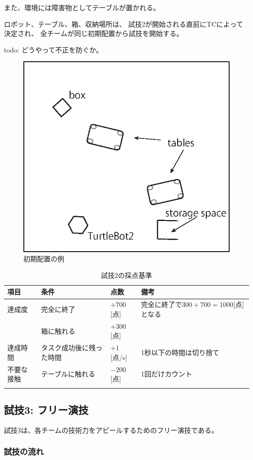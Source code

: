 \documentclass[a4j]{jarticle}
\def\thline{\noalign{\hrule height 1pt}}
\begin{document}
また、環境には障害物としてテーブルが置かれる。

ロボット、テーブル、箱、収納場所は、
試技2が開始される直前にTCによって決定され、
全チームが同じ初期配置から試技を開始する。

todo: どうやって不正を防ぐか。


\begin{figure}[h]
	\begin{center}
		\includegraphics[width=0.4\linewidth]{./IMAGE/test2.eps}
		\caption{初期配置の例}
		\label{fig:test2}
	\end{center}
\end{figure}

\begin{table}
\begin{center}
\caption{試技2の採点基準}
\label{table:test1score}
\begin{tabular}{l|p{5cm}|l|p{5cm}}
\thline
項目 & 条件 & 点数 & 備考\\
\hline
達成度 & 完全に終了 & $+700$[点] & 完全に終了で$300 + 700 = 1000$[点]となる \\
& 箱に触れる & $+300$[点] & \\
\hline
達成時間 & タスク成功後に残った時間 & $+1$[点/s] & 1秒以下の時間は切り捨て\\
\hline
不要な接触 & テーブルに触れる & $-200$[点] & 1回だけカウント\\
\thline
\end{tabular}
\end{center}
\end{table}


\subsection{試技3: フリー演技}

試技3は、各チームの技術力をアピールするためのフリー演技である。

\subsubsection{試技の流れ}
\end{document}
